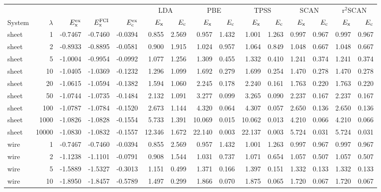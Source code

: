 \begin{tabular}{lrrrrrrrrrrrrrr}
\toprule
& & & & & \multicolumn{2}{c}{LDA} & \multicolumn{2}{c}{PBE} & \multicolumn{2}{c}{TPSS} & \multicolumn{2}{c}{SCAN} & \multicolumn{2}{c}{r$^2$SCAN} \\
System & $\lambda$ & $E_{\rm x}^{\rm ex}$ & $E_{\rm x}^{\rm FCI}$ & $E_{\rm c}^{\rm ex}$ & $E_{\rm x}$ & $E_{\rm c}$ & $E_{\rm x}$ & $E_{\rm c}$ & $E_{\rm x}$ & $E_{\rm c}$ & $E_{\rm x}$ & $E_{\rm c}$ & $E_{\rm x}$ & $E_{\rm c}$ \\
\midrule
sheet & 1 & -0.7467 & -0.7460 & -0.0394 & 0.855 & 2.569 & 0.957 & 1.432 & 1.001 & 1.263 & 0.997 & 0.967 & 0.997 & 0.967 \\
sheet & 2 & -0.8933 & -0.8895 & -0.0581 & 0.900 & 1.915 & 1.024 & 0.957 & 1.064 & 0.849 & 1.048 & 0.667 & 1.048 & 0.667 \\
sheet & 5 & -1.0004 & -0.9954 & -0.0992 & 1.077 & 1.256 & 1.309 & 0.455 & 1.332 & 0.410 & 1.241 & 0.374 & 1.241 & 0.374 \\
sheet & 10 & -1.0405 & -1.0369 & -0.1232 & 1.296 & 1.099 & 1.692 & 0.279 & 1.699 & 0.254 & 1.470 & 0.278 & 1.470 & 0.278 \\
sheet & 20 & -1.0615 & -1.0594 & -0.1382 & 1.594 & 1.060 & 2.245 & 0.178 & 2.240 & 0.161 & 1.763 & 0.220 & 1.763 & 0.220 \\
sheet & 50 & -1.0744 & -1.0735 & -0.1484 & 2.132 & 1.091 & 3.277 & 0.099 & 3.265 & 0.090 & 2.237 & 0.167 & 2.237 & 0.167 \\
sheet & 100 & -1.0787 & -1.0784 & -0.1520 & 2.673 & 1.144 & 4.320 & 0.064 & 4.307 & 0.057 & 2.650 & 0.136 & 2.650 & 0.136 \\
sheet & 1000 & -1.0826 & -1.0828 & -0.1554 & 5.733 & 1.391 & 10.069 & 0.015 & 10.062 & 0.013 & 4.210 & 0.066 & 4.210 & 0.066 \\
sheet & 10000 & -1.0830 & -1.0832 & -0.1557 & 12.346 & 1.672 & 22.140 & 0.003 & 22.137 & 0.003 & 5.724 & 0.031 & 5.724 & 0.031 \\
\midrule
wire & 1 & -0.7467 & -0.7460 & -0.0394 & 0.855 & 2.569 & 0.957 & 1.432 & 1.001 & 1.263 & 0.997 & 0.967 & 0.997 & 0.967 \\
wire & 2 & -1.1238 & -1.1101 & -0.0791 & 0.908 & 1.544 & 1.031 & 0.737 & 1.071 & 0.654 & 1.057 & 0.507 & 1.057 & 0.507 \\
wire & 5 & -1.5889 & -1.5327 & -0.3013 & 1.151 & 0.499 & 1.371 & 0.166 & 1.397 & 0.151 & 1.332 & 0.133 & 1.332 & 0.133 \\
wire & 10 & -1.8950 & -1.8457 & -0.5789 & 1.497 & 0.299 & 1.866 & 0.070 & 1.875 & 0.065 & 1.720 & 0.067 & 1.720 & 0.067 \\

\end{tabular}
